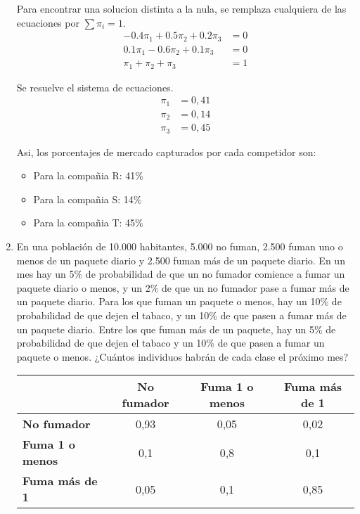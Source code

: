 \documentclass{templateNote}
\begin{document}
\begin{enumerate}
    Para encontrar una solucion distinta a la nula, se remplaza cualquiera de las ecuaciones por $\sum \pi_i = 1$.
    \begin{eqnarray*}
        -0.4 \pi_1 + 0.5 \pi_2 + 0.2 \pi_3 &= 0 \\
        0.1 \pi_1 - 0.6 \pi_2 + 0.1 \pi_3 &= 0 \\
        \pi_1 + \pi_2 + \pi_3 &= 1
    \end{eqnarray*}

    Se resuelve el sistema de ecuaciones.
    \begin{eqnarray*}
        \pi_1 &= 0,41 \\
        \pi_2 &= 0,14 \\
        \pi_3 &= 0,45
    \end{eqnarray*}

    Asi, los porcentajes de mercado capturados por cada competidor son:
    \begin{itemize}
        \item Para la compa\~nia R: 41\%
        \item Para la compa\~nia S: 14\%
        \item Para la compa\~nia T: 45\%
    \end{itemize}

    \newpage
    \item En una población de 10.000 habitantes, 5.000 no fuman, 2.500 fuman uno o menos de un paquete diario y 2.500 fuman más de un paquete diario. En un mes hay un 5\% de probabilidad de que un no fumador comience a fumar un paquete diario o menos, y un 2\% de que un no fumador pase a fumar más de un paquete diario. Para los que fuman un paquete o menos, hay un 10\% de probabilidad de que dejen el tabaco, y un 10\% de que pasen a fumar más de un paquete diario. Entre los que fuman más de un paquete, hay un 5\% de probabilidad de que dejen el tabaco y un 10\% de que pasen a fumar un paquete o menos. ¿Cuántos individuos habrán de cada clase el próximo mes?
    
    \begin{center}
        \begin{tabular}{g|c|c|c|}
             & \textbf{No fumador} & \textbf{Fuma 1 o menos} & \textbf{Fuma más de 1} \\
            \hline
            \textbf{No fumador} & 0,93 & 0,05 & 0,02 \\
            \hline
            \textbf{Fuma 1 o menos} & 0,1 & 0,8 & 0,1 \\
            \hline
            \textbf{Fuma más de 1} & 0,05 & 0,1 & 0,85 \\
            \hline
        \end{tabular}
    \end{center}


\end{enumerate}
\end{document}
